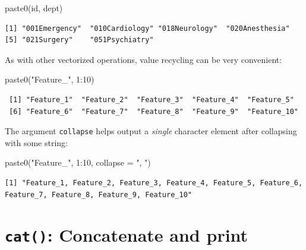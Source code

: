 \documentclass[
]{book}
\newenvironment{Shaded}{\begin{snugshade}}{\end{snugshade}}
\newcommand{\AttributeTok}[1]{\textcolor[rgb]{0.77,0.63,0.00}{#1}}
\newcommand{\DecValTok}[1]{\textcolor[rgb]{0.00,0.00,0.81}{#1}}
\newcommand{\FunctionTok}[1]{\textcolor[rgb]{0.00,0.00,0.00}{#1}}
\newcommand{\NormalTok}[1]{#1}
\newcommand{\SpecialCharTok}[1]{\textcolor[rgb]{0.00,0.00,0.00}{#1}}
\newcommand{\StringTok}[1]{\textcolor[rgb]{0.31,0.60,0.02}{#1}}
\begin{document}
\begin{Shaded}
\begin{Highlighting}[]
\FunctionTok{paste0}\NormalTok{(id, dept)}
\end{Highlighting}
\end{Shaded}

\begin{verbatim}
[1] "001Emergency"  "010Cardiology" "018Neurology"  "020Anesthesia"
[5] "021Surgery"    "051Psychiatry"
\end{verbatim}

As with other vectorized operations, value recycling can be very convenient:

\begin{Shaded}
\begin{Highlighting}[]
\FunctionTok{paste0}\NormalTok{(}\StringTok{"Feature\_"}\NormalTok{, }\DecValTok{1}\SpecialCharTok{:}\DecValTok{10}\NormalTok{)}
\end{Highlighting}
\end{Shaded}

\begin{verbatim}
 [1] "Feature_1"  "Feature_2"  "Feature_3"  "Feature_4"  "Feature_5" 
 [6] "Feature_6"  "Feature_7"  "Feature_8"  "Feature_9"  "Feature_10"
\end{verbatim}

The argument \texttt{collapse} helps output a \emph{single} character element after collapsing with some string:

\begin{Shaded}
\begin{Highlighting}[]
\FunctionTok{paste0}\NormalTok{(}\StringTok{"Feature\_"}\NormalTok{, }\DecValTok{1}\SpecialCharTok{:}\DecValTok{10}\NormalTok{, }\AttributeTok{collapse =} \StringTok{", "}\NormalTok{)}
\end{Highlighting}
\end{Shaded}

\begin{verbatim}
[1] "Feature_1, Feature_2, Feature_3, Feature_4, Feature_5, Feature_6, Feature_7, Feature_8, Feature_9, Feature_10"
\end{verbatim}

\hypertarget{cat-concatenate-and-print}{%
\section{\texorpdfstring{\texttt{cat()}: Concatenate and \textbf{print}}{cat(): Concatenate and print}}\label{cat-concatenate-and-print}}
\end{document}
